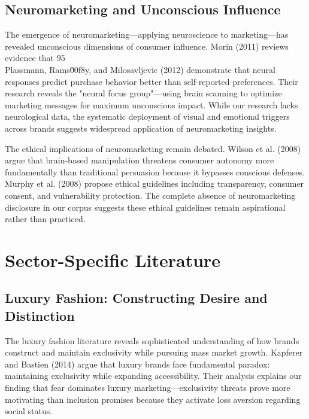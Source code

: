 \subsection{Neuromarketing and Unconscious Influence}

The emergence of neuromarketing—applying neuroscience to marketing—has revealed unconscious dimensions of consumer influence. Morin (2011) reviews evidence that 95\\%

Plassmann, Rams\u00f8y, and Milosavljevic (2012) demonstrate that neural responses predict purchase behavior better than self-reported preferences. Their research reveals the "neural focus group"—using brain scanning to optimize marketing messages for maximum unconscious impact. While our research lacks neurological data, the systematic deployment of visual and emotional triggers across brands suggests widespread application of neuromarketing insights.

The ethical implications of neuromarketing remain debated. Wilson et al. (2008) argue that brain-based manipulation threatens consumer autonomy more fundamentally than traditional persuasion because it bypasses conscious defenses. Murphy et al. (2008) propose ethical guidelines including transparency, consumer consent, and vulnerability protection. The complete absence of neuromarketing disclosure in our corpus suggests these ethical guidelines remain aspirational rather than practiced.

\section{Sector-Specific Literature}
\label{sec:sector_lit}

\subsection{Luxury Fashion: Constructing Desire and Distinction}

The luxury fashion literature reveals sophisticated understanding of how brands construct and maintain exclusivity while pursuing mass market growth. Kapferer and Bastien (2014) argue that luxury brands face fundamental paradox: maintaining exclusivity while expanding accessibility. Their analysis explains our finding that fear dominates luxury marketing—exclusivity threats prove more motivating than inclusion promises because they activate loss aversion regarding social status.

